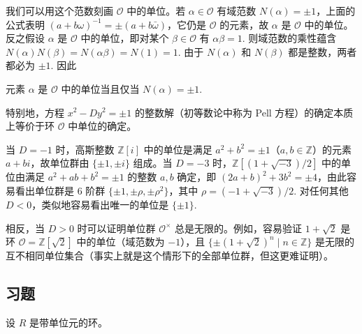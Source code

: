 \begin{example}[二次整数环]
我们可以用这个范数刻画 \(\mathcal{O}\) 中的单位。若 \(\alpha \in \mathcal{O}\) 有域范数 \(N(\alpha) = \pm 1\)，上面的公式表明 \((a+b\omega)^{-1} = \pm(a + b\bar\omega)\)，它仍是 \(\mathcal{O}\) 的元素，故 \(\alpha\) 是 \(\mathcal{O}\) 中的单位。反之假设 \(\alpha\) 是 \(\mathcal{O}\) 中的单位，即对某个 \(\beta \in \mathcal{O}\) 有 \(\alpha\beta = 1\). 则域范数的乘性蕴含 \(N(\alpha)N(\beta) = N(\alpha\beta) = N(1) = 1\). 由于 \(N(\alpha)\) 和 \(N(\beta)\) 都是整数，两者都必为 \(\pm 1\). 因此
\begin{center}
元素 \(\alpha\) 是 \(\mathcal{O}\) 中的单位当且仅当 \(N(\alpha) = \pm 1\).
\end{center}
特别地，方程 \(x^2 - Dy^2 = \pm 1\) 的整数解（初等数论中称为 Pell 方程）的确定本质上等价于环 \(\mathcal{O}\) 中单位的确定。

当 \(D = -1\) 时，高斯整数 \(\mathbb{Z}[i]\) 中的单位是满足 \(a^2 + b^2 = \pm 1\)（\(a, b \in \mathbb{Z}\)）的元素 \(a+bi\)，故单位群由 \(\{\pm 1, \pm i\}\) 组成。当 \(D = -3\) 时，\(\mathbb{Z}[(1+\sqrt{-3})/2]\) 中的单位由满足 \(a^2 + ab + b^2 = \pm 1\) 的整数 \(a, b\) 确定，即 \((2a+b)^2 + 3b^2 = \pm 4\)，由此容易看出单位群是 6 阶群 \(\{\pm 1, \pm \rho, \pm \rho^2\}\)，其中 \(\rho = (-1+\sqrt{-3})/2\). 对任何其他 \(D < 0\)，类似地容易看出唯一的单位是 \(\{\pm 1\}\).

相反，当 \(D > 0\) 时可以证明单位群 \(\mathcal{O}^\times\) 总是无限的。例如，容易验证 \(1 + \sqrt{2}\) 是环 \(\mathcal{O} = \mathbb{Z}[\sqrt{2}]\) 中的单位（域范数为 \(-1\)），且 \(\{\pm(1+\sqrt{2})^n \mid n \in \mathbb{Z}\}\) 是无限的互不相同单位集合（事实上就是这个情形下的全部单位群，但这更难证明）。
\end{example}

\subsection*{习题}
设 \(R\) 是带单位元的环。

